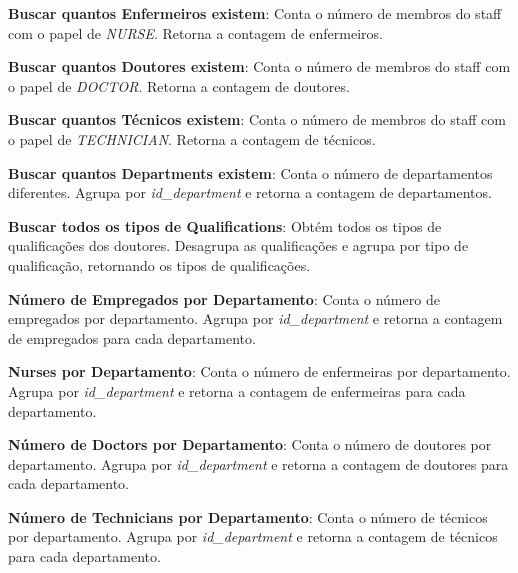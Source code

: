 \vspace{0.15cm}

\textbf{Buscar quantos Enfermeiros existem}: Conta o número de membros do staff com o papel de \textit{NURSE}. Retorna a contagem de enfermeiros.

\vspace{0.15cm}

\textbf{Buscar quantos Doutores existem}: Conta o número de membros do staff com o papel de \textit{DOCTOR}. Retorna a contagem de doutores.

\vspace{0.15cm}

\textbf{Buscar quantos Técnicos existem}: Conta o número de membros do staff com o papel de \textit{TECHNICIAN}. Retorna a contagem de técnicos.

\vspace{0.15cm}

\textbf{Buscar quantos Departments existem}: Conta o número de departamentos diferentes. Agrupa por \textit{id\_department} e retorna a contagem de departamentos.

\vspace{0.15cm}

\textbf{Buscar todos os tipos de Qualifications}: Obtém todos os tipos de qualificações dos doutores. Desagrupa as qualificações e agrupa por tipo de qualificação, retornando os tipos de qualificações.

\vspace{0.15cm}

\textbf{Número de Empregados por Departamento}: Conta o número de empregados por departamento. Agrupa por \textit{id\_department} e retorna a contagem de empregados para cada departamento.

\vspace{0.15cm}

\textbf{Nurses por Departamento}: Conta o número de enfermeiras por departamento. Agrupa por \textit{id\_department} e retorna a contagem de enfermeiras para cada departamento.

\vspace{0.15cm}

\textbf{Número de Doctors por Departamento}: Conta o número de doutores por departamento. Agrupa por \textit{id\_department} e retorna a contagem de doutores para cada departamento.

\vspace{0.15cm}

\textbf{Número de Technicians por Departamento}: Conta o número de técnicos por departamento. Agrupa por \textit{id\_department} e retorna a contagem de técnicos para cada departamento.

